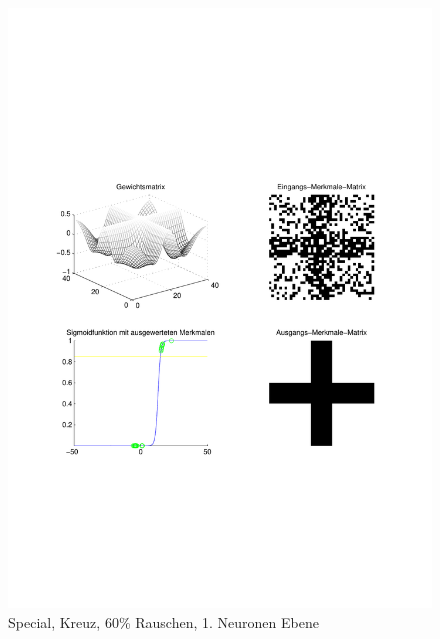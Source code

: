 \begin{figure}[hbt]
	\begin{minipage}{0.8 \textwidth}
		\includegraphics[width=\textwidth]{./Bilder/Auswertung/Endergebnis/TypeSpecial_Rauschen60_Cross_Layer1}
		\caption{Special, Kreuz, 60\% Rauschen, 1. Neuronen Ebene}
		\label{Special_Kreuz_60_1}
	\end{minipage}
	\vfill
	\begin{minipage}{0.8 \textwidth}

\end{minipage}
\end{figure}
